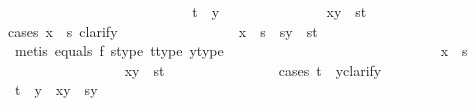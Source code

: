 \begin{isabellebody}
\ \ \ \ \ \ \ \ \ \ \ \isamarkupfalse%
\isanewline
\ \ \ \ \ \ \ \ \ \ \ \ \ \isamarkupfalse%
\ {\isachardoublequoteopen}t\ {\isasymnoteq}\ y{}{\isachardoublequoteclose}\isanewline
\ \ \ \ \ \ \ \ \ \ \ \ \ \isamarkupfalse%
\ {\isachardoublequoteopen}{\isasymlangle}x{\isacharcomma}{\kern0pt}y{\isasymrangle}\ {\isacharequal}{\kern0pt}\ {\isasymlangle}s{\isacharcomma}{\kern0pt}t{\isasymrangle}{\isachardoublequoteclose}\isanewline
\ \ \ \ \ \ \ \ \ \ \ \ \ \isamarkupfalse%
{\isacharparenleft}{\kern0pt}cases\ {\isachardoublequoteopen}x\ {\isacharequal}{\kern0pt}\ s{\isachardoublequoteclose}{\isacharcomma}{\kern0pt}\ clarify{\isacharparenright}{\kern0pt}\isanewline
\ \ \ \ \ \ \ \ \ \ \ \ \ \ \ \isamarkupfalse%
\ {\isachardoublequoteopen}x\ {\isacharequal}{\kern0pt}\ s\ {\isasymLongrightarrow}\ {\isasymlangle}s{\isacharcomma}{\kern0pt}y{\isasymrangle}\ {\isacharequal}{\kern0pt}\ {\isasymlangle}s{\isacharcomma}{\kern0pt}t{\isasymrangle}{\isachardoublequoteclose}\isanewline
\ \ \ \ \ \ \ \ \ \ \ \ \ \ \ \ \ \isamarkupfalse%
\ {\isacharparenleft}{\kern0pt}metis\ equals{}\ f{}\ s{\isacharunderscore}{\kern0pt}type\ t{\isacharunderscore}{\kern0pt}type\ y{\isacharunderscore}{\kern0pt}type{\isacharparenright}{\kern0pt}\isanewline
\ \ \ \ \ \ \ \ \ \ \ \ \ \isamarkupfalse%
\isanewline
\ \ \ \ \ \ \ \ \ \ \ \ \ \ \ \isamarkupfalse%
\ {\isachardoublequoteopen}x\ {\isasymnoteq}\ s{\isachardoublequoteclose}\isanewline
\ \ \ \ \ \ \ \ \ \ \ \ \ \ \ \isamarkupfalse%
\ {\isachardoublequoteopen}{\isasymlangle}x{\isacharcomma}{\kern0pt}y{\isasymrangle}\ {\isacharequal}{\kern0pt}\ {\isasymlangle}s{\isacharcomma}{\kern0pt}t{\isasymrangle}{\isachardoublequoteclose}\isanewline
\ \ \ \ \ \ \ \ \ \ \ \ \ \ \ \isamarkupfalse%
{\isacharparenleft}{\kern0pt}cases\ {\isachardoublequoteopen}t\ {\isacharequal}{\kern0pt}\ y{}{\isachardoublequoteclose}{\isacharcomma}{\kern0pt}clarify{\isacharparenright}{\kern0pt}\isanewline
\ \ \ \ \ \ \ \ \ \ \ \ \ \ \ \ \ \isamarkupfalse%
\ {\isachardoublequoteopen}t\ {\isacharequal}{\kern0pt}\ y{}\ {\isasymLongrightarrow}\ {\isasymlangle}x{\isacharcomma}{\kern0pt}y{\isasymrangle}\ {\isacharequal}{\kern0pt}\ {\isasymlangle}s{\isacharcomma}{\kern0pt}y{}{\isasymrangle}{\isachardoublequoteclose}\isanewline
\ \ \ \ \ \ \ \ \ \ \ \ \ \ \ \ \ \ \ \isamarkupfalse%

\end{isabellebody}
